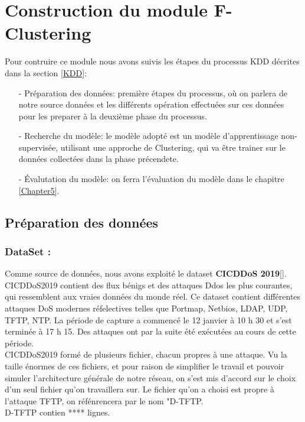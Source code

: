 \section{Construction du module F-Clustering}
Pour contruire ce module nous avons suivis les étapes du processus KDD décrites dans la section \ref{KDD}:
\begin{itemize}
\item[-] Préparation des données: première étapes du processus, où on parlera de notre source données et les différents opération effectuées sur ces données pour les preparer à la deuxième phase du processus. 
\item[-] Recherche du modèle: le modèle adopté est un modèle d'apprentissage non-supervisée, utilisant une approche de Clustering, qui va être trainer sur le données collectées dans la phase précendete.
\item[-] Évalutation du modèle: on ferra l'évaluation du modèle dans le chapitre \ref{Chapter5}.
\end{itemize}

\subsection{Préparation des données}
\subsubsection{DataSet : }
Comme source de données, nous avons exploité le dataset \textbf{ CICDDoS 2019}[\citep{18}]. CICDDoS2019 contient des flux bénigs et des attaques Ddos les plus courantes, qui ressemblent aux vraies données du monde réel. Ce dataset contient différentes attaques DoS modernes réfelectives telles que Portmap, Netbios, LDAP, UDP, TFTP, NTP. La période de capture a commencé le 12 janvier à 10 h 30 et s’est terminée à 17 h 15. Des attaques ont par la suite été exécutées au cours de cette période. \\

CICDDoS2019 formé de plusieurs fichier, chacun propres à une attaque. Vu la taille énormes de ces fichiers, et pour raison de simplifier le travail et pouvoir simuler l'architecture générale de notre réseau, on s'est mis d'accord sur le choix d'un seul fichier qu'on travaillera sur. Le fichier qu'on a choisi est propre à l'attaque TFTP, on réfénrencera par le nom "D-TFTP.\\

D-TFTP contien **** lignes. 
